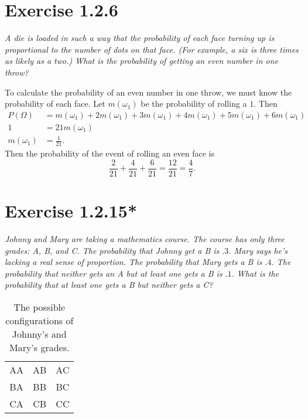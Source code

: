 \documentclass{tufte-handout}
\begin{document}
\section{Exercise 1.2.6}

\emph{A die is loaded in such a way that the probability of each
  face turning up is proportional to the number of dots on that
  face. (For example, a six is three times as likely as a two.) What
  is the probability of getting an even number in one throw?}

\bigskip

To calculate the probability of an even number in one throw, we must
know the probability of each face. Let $m(\omega_1)$ be the
probability of rolling a $1$. Then
\begin{align*}
  P(\Omega) &= m(\omega_1) + 2m(\omega_1) + 3m(\omega_1) + 4m(\omega_1) +
  5m(\omega_1) + 6m(\omega_1)\\
  1 &= 21m(\omega_1)\\
  m(\omega_1) &= \frac{1}{21}.
\end{align*}
Then the probability of the event of rolling an even face is
\[\frac{2}{21} + \frac{4}{21} + \frac{6}{21} = \frac{12}{21} =
\frac{4}{7}.\]

\section{Exercise 1.2.15*}

\emph{Johnny and Mary are taking a mathematics course. The course has
    only three grades: A, B, and C. The probability that Johnny get a
    B is $.3$. Mary says he's lacking a real sense of proportion. The
    probability that Mary gets a B is $.4$. The probability that
    neither gets an A but at least one gets a B is $.1$. What is the
    probability that at least one gets a B but neither gets a C?}

\bigskip

\begin{table}[h]
  \centering
  \begin{tabular}{ccc}
    \toprule
    AA & AB & AC \\
    BA & BB & BC \\
    CA & CB & CC \\
    \bottomrule
  \end{tabular}
  \caption{The possible configurations of Johnny's and Mary's grades.}
  \label{tab:1.2.15}
\end{table}

\bigskip
\end{document}
